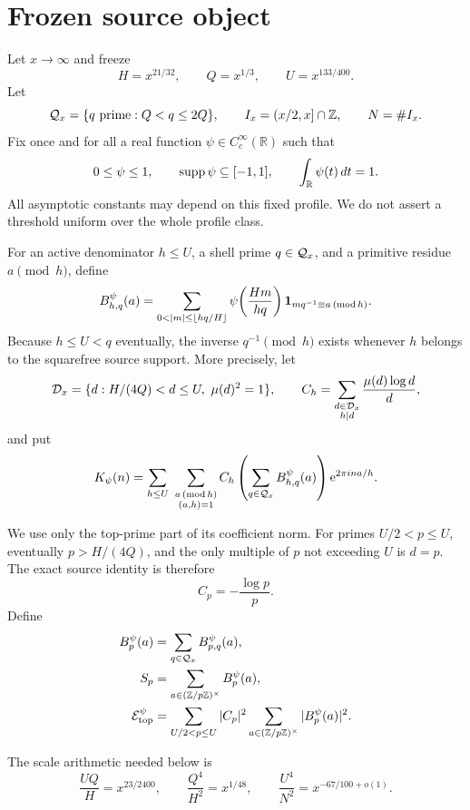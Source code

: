 \section{Frozen source object}\label{sec:setup}

Let $x\to\infty$ and freeze
\begin{equation}\label{eq:scales}
 H=x^{21/32},\qquad Q=x^{1/3},\qquad U=x^{133/400}.
\end{equation}
Let
\[
 \mathcal{Q}_x=\{q\text{ prime}:Q<q\leq 2Q\},
 \qquad I_x=(x/2,x]\cap\mathbb Z,
 \qquad N=\#I_x.
\]
Fix once and for all a real function $\psi\in C_c^\infty(\mathbb R)$ such that
\begin{equation}\label{eq:profile}
 0\leq\psi\leq1,\qquad \operatorname{supp}\psi\subseteq[-1,1],
 \qquad \int_{\mathbb R}\psi(t)\,dt=1.
\end{equation}
All asymptotic constants may depend on this fixed profile.  We do not assert a
threshold uniform over the whole profile class.

For an active denominator $h\leq U$, a shell prime $q\in\mathcal{Q}_x$, and a primitive
residue $a\pmod h$, define
\begin{equation}\label{eq:B_hq}
 B_{h,q}^{\psi}(a)
 =\sum_{0<|m|\leq\lfloor hq/H\rfloor}
 \psi\!\left(\frac{Hm}{hq}\right)
 \one_{m q^{-1}\equiv a\, (\mathrm{mod}\,h)}.
\end{equation}
Because $h\leq U<q$ eventually, the inverse $q^{-1}\pmod h$ exists whenever
$h$ belongs to the squarefree source support.  More precisely, let
\[
 \mathcal{D}_x=\{d:H/(4Q)<d\leq U,\ \mu(d)^2=1\},\qquad
 C_h=\sum_{\substack{d\in\mathcal{D}_x\\h\mid d}}\frac{\mu(d)\log d}{d},
\]
and put
\begin{equation}\label{eq:full_kernel}
 K_\psi(n)=\sum_{h\leq U}\ \sum_{\substack{a\, (\mathrm{mod}\,h)\\(a,h)=1}}
 C_h\left(\sum_{q\in\mathcal{Q}_x}B_{h,q}^{\psi}(a)\right)
 \mathrm{e}^{2\pi i n a/h}.
\end{equation}

We use only the top-prime part of its coefficient norm.  For primes
$U/2<p\leq U$, eventually $p>H/(4Q)$, and the only multiple of $p$ not
exceeding $U$ is $d=p$.  The exact source identity is therefore
\begin{equation}\label{eq:Cp}
 C_p=-\frac{\log p}{p}.
\end{equation}
Define
\begin{align}
 B_p^\psi(a)&=\sum_{q\in\mathcal{Q}_x}B_{p,q}^\psi(a),\label{eq:Bp}\\
 S_p&=\sum_{a\in(\mathbb Z/p\mathbb Z)^\times}B_p^\psi(a),\label{eq:Sp}\\
 \mathcal{E}_{\mathrm{top}}^{\psi}&=\sum_{U/2<p\leq U}|C_p|^2
 \sum_{a\in(\mathbb Z/p\mathbb Z)^\times}|B_p^\psi(a)|^2.
 \label{eq:Etop}
\end{align}

The scale arithmetic needed below is
\begin{equation}\label{eq:scale_arithmetic}
 \frac{UQ}{H}=x^{23/2400},\qquad
 \frac{Q^4}{H^2}=x^{1/48},\qquad
 \frac{U^4}{N^2}=x^{-67/100+o(1)}.
\end{equation}
